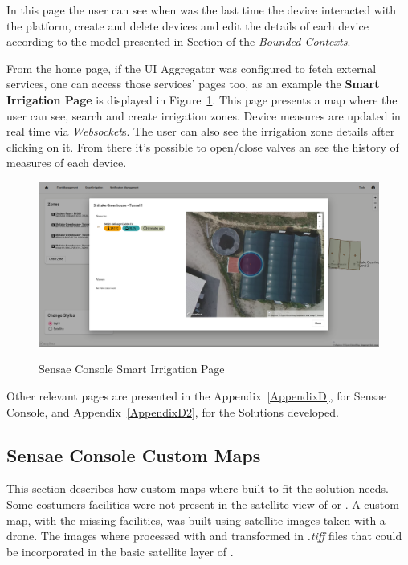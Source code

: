 In this page the user can see when was the last time the device interacted with the platform, create and delete devices and edit the details of each device according to the model presented in Section of the \textit{Bounded Contexts}.

From the home page, if the UI Aggregator was configured to fetch external services, one can access those services' pages too, as an example the \textbf{Smart Irrigation Page} is displayed in Figure~\ref{fig:implementation:description:ui:smartirrigation}.
This page presents a map where the user can see, search and create irrigation zones. Device measures are updated in real time via \textit{Websocket}s. The user can also see the irrigation zone details after clicking on it. From there it's possible to open/close valves an see the history of measures of each device.

\begin{figure}[H]
    \centering
    \resizebox{\columnwidth}{!}
    {
       \includegraphics{assets/figures/ui/smart-irrigation.png}
    }
    \caption[Sensae Console Smart Irrigation Page]{Sensae Console Smart Irrigation Page}
    \label{fig:implementation:description:ui:smartirrigation}
\end{figure}

Other relevant pages are presented in the Appendix~\ref{AppendixD}, for Sensae Console, and Appendix~\ref{AppendixD2}, for the Solutions developed.

\subsection{Sensae Console Custom Maps}
\label{subsec:implementation:description:maps}

This section describes how custom maps where built to fit the solution needs. Some costumers facilities were not present in the satellite view of  or . A custom map, with the missing facilities, was built using satellite images taken with a drone. The images where processed with  and transformed in \textit{.tiff} files that could be incorporated in the basic satellite layer of .

